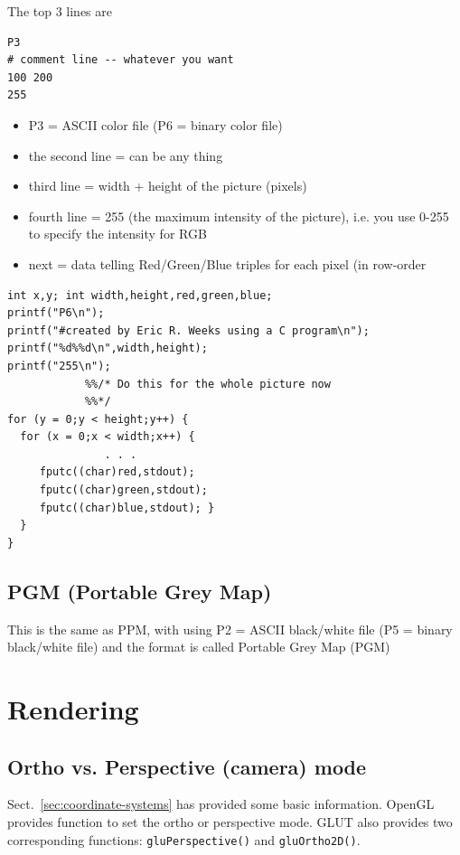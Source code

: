 The top 3 lines are
\begin{verbatim}
P3
# comment line -- whatever you want
100 200
255 
\end{verbatim}
\begin{itemize}
\item P3 = ASCII color file (P6 = binary color file)
\item the second line = can be any thing
\item third line = width + height of the picture (pixels)
\item fourth line = 255 (the maximum intensity of the picture),
  i.e. you use 0-255 to specify the intensity for RGB
\item next = data telling Red/Green/Blue triples for each pixel (in
  row-order
\end{itemize}

\begin{verbatim}
int x,y; int width,height,red,green,blue; 
printf("P6\n"); 
printf("#created by Eric R. Weeks using a C program\n"); 
printf("%d%%d\n",width,height); 
printf("255\n");
            %%/* Do this for the whole picture now
            %%*/ 
for (y = 0;y < height;y++) { 
  for (x = 0;x < width;x++) {
               . . . 
     fputc((char)red,stdout);
     fputc((char)green,stdout);
     fputc((char)blue,stdout); } 
  } 
}
\end{verbatim}

\subsection{PGM (Portable Grey Map)}
\label{sec:pgm-portable-grey}

This is the same as PPM, with using P2 = ASCII black/white file (P5 =
binary black/white file) and the format is called Portable Grey Map
(PGM)


\section{Rendering}
\label{sec:rendering}


\subsection{Ortho vs. Perspective (camera) mode}
\label{sec:ortho-vs.-persp}

Sect.~\ref{sec:coordinate-systems} has provided some basic
information. OpenGL provides function to set the ortho or perspective
mode. GLUT also provides two corresponding functions:
\verb!gluPerspective()! and \verb!gluOrtho2D()!.

